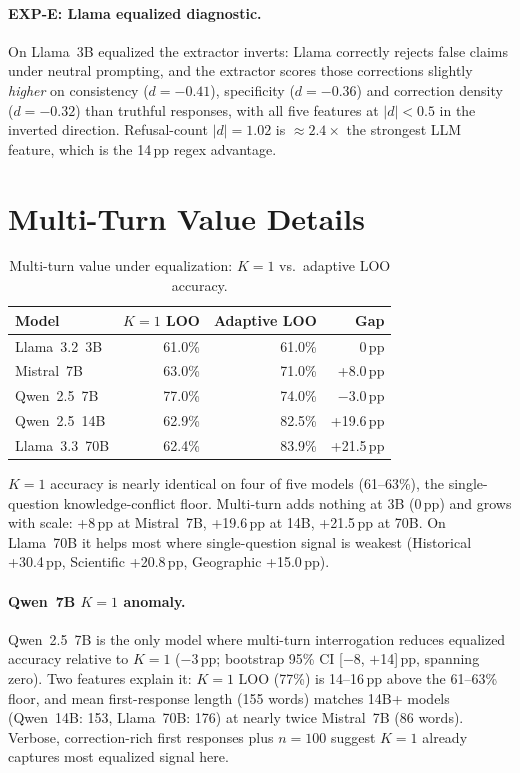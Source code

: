 \paragraph{EXP-E: Llama equalized diagnostic.} On Llama~3B equalized the extractor inverts: Llama correctly rejects false claims under neutral prompting, and the extractor scores those corrections slightly \emph{higher} on consistency ($d=-0.41$), specificity ($d=-0.36$) and correction density ($d=-0.32$) than truthful responses, with all five features at $|d|<0.5$ in the inverted direction. Refusal-count $|d|=1.02$ is $\approx\!2.4\times$ the strongest LLM feature, which is the 14\,pp regex advantage.

\section{Multi-Turn Value Details}
\label{app:multiturn_details}

\begin{table}[h]
\centering
\caption{Multi-turn value under equalization: $K=1$ vs.\ adaptive LOO accuracy.}
\label{tab:multiturn_equalized}
\begin{tabular}{lrrr}
\toprule
\textbf{Model} & \textbf{$K=1$ LOO} & \textbf{Adaptive LOO} & \textbf{Gap} \\
\midrule
Llama~3.2~3B   & 61.0\% & 61.0\% & 0\,pp \\
Mistral~7B     & 63.0\% & 71.0\% & +8.0\,pp \\
Qwen~2.5~7B    & 77.0\% & 74.0\% & $-$3.0\,pp \\
Qwen~2.5~14B   & 62.9\% & 82.5\% & +19.6\,pp \\
Llama~3.3~70B  & 62.4\% & 83.9\% & +21.5\,pp \\
\bottomrule
\end{tabular}
\end{table}

$K=1$ accuracy is nearly identical on four of five models (61--63\%), the single-question knowledge-conflict floor. Multi-turn adds nothing at 3B (0\,pp) and grows with scale: +8\,pp at Mistral~7B, +19.6\,pp at 14B, +21.5\,pp at 70B. On Llama~70B it helps most where single-question signal is weakest (Historical +30.4\,pp, Scientific +20.8\,pp, Geographic +15.0\,pp).

\paragraph{Qwen~7B $K=1$ anomaly.} Qwen~2.5~7B is the only model where multi-turn interrogation reduces equalized accuracy relative to $K=1$ ($-$3\,pp; bootstrap 95\% CI [$-$8, $+$14]\,pp, spanning zero). Two features explain it: $K=1$ LOO (77\%) is 14--16\,pp above the 61--63\% floor, and mean first-response length (155 words) matches 14B+ models (Qwen~14B: 153, Llama~70B: 176) at nearly twice Mistral~7B (86 words). Verbose, correction-rich first responses plus $n=100$ suggest $K=1$ already captures most equalized signal here.

